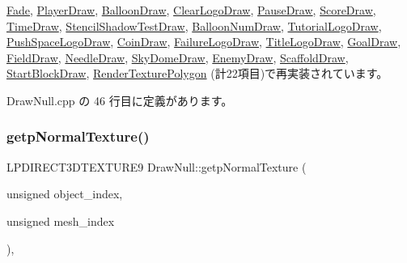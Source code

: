 \mbox{\hyperlink{class_fade_a468f87b671026f883443d6cdceeb95c6}{Fade}}, \mbox{\hyperlink{class_player_draw_a334e94f368f6bd571da866d69333f313}{Player\+Draw}}, \mbox{\hyperlink{class_balloon_draw_ab98a9333dcdf57c0ede287444b7cbabb}{Balloon\+Draw}}, \mbox{\hyperlink{class_clear_logo_draw_abcbd0cd8663e0262bcdd83356516082b}{Clear\+Logo\+Draw}}, \mbox{\hyperlink{class_pause_draw_a36622378926e01e7a401b6e201cb4f16}{Pause\+Draw}}, \mbox{\hyperlink{class_score_draw_adb995c83624c2eab8b8a15d1182df5b8}{Score\+Draw}}, \mbox{\hyperlink{class_time_draw_a3624fef571681cf4861891aa073338a0}{Time\+Draw}}, \mbox{\hyperlink{class_stencil_shadow_test_draw_a8ab105b75d673adc52698a8401c6525c}{Stencil\+Shadow\+Test\+Draw}}, \mbox{\hyperlink{class_balloon_num_draw_a9a337ac248ebb73dc32ef407221a6478}{Balloon\+Num\+Draw}}, \mbox{\hyperlink{class_tutorial_logo_draw_aade531190180c385c266f5698f99735d}{Tutorial\+Logo\+Draw}}, \mbox{\hyperlink{class_push_space_logo_draw_a9e0875967651293ef97713477334bc2e}{Push\+Space\+Logo\+Draw}}, \mbox{\hyperlink{class_coin_draw_ad8cbbe87f4cf4428214f50492c731f5f}{Coin\+Draw}}, \mbox{\hyperlink{class_failure_logo_draw_a6e6fb80dc21af9318d659bc3fa71c0b5}{Failure\+Logo\+Draw}}, \mbox{\hyperlink{class_title_logo_draw_a34fa4366f1ff190a08a36f8e402f6941}{Title\+Logo\+Draw}}, \mbox{\hyperlink{class_goal_draw_a536a23c043576f9032e6651d7644d038}{Goal\+Draw}}, \mbox{\hyperlink{class_field_draw_ad399978201f737f4c0dd2b3990fa6b34}{Field\+Draw}}, \mbox{\hyperlink{class_needle_draw_a7ae74f52a190793745b5339a6be559d7}{Needle\+Draw}}, \mbox{\hyperlink{class_sky_dome_draw_accbc05d1bbde9ad9d6b7180d91e9ed89}{Sky\+Dome\+Draw}}, \mbox{\hyperlink{class_enemy_draw_afbb8ac19041abda280ece7737103dc66}{Enemy\+Draw}}, \mbox{\hyperlink{class_scaffold_draw_a337aafb07b51a215f7f25ab67202b102}{Scaffold\+Draw}}, \mbox{\hyperlink{class_start_block_draw_a062b7069d21ec07630f6c8aeea532401}{Start\+Block\+Draw}}, \mbox{\hyperlink{class_render_texture_polygon_a76ab48dff0a23ee4db47da598f4d6a70}{Render\+Texture\+Polygon}} (計22項目)で再実装されています。



 Draw\+Null.\+cpp の 46 行目に定義があります。

\mbox{\label{class_draw_null_abdb03713b973fd1f65c914fa146414a1}} 
\subsubsection{\texorpdfstring{getp\+Normal\+Texture()}{getpNormalTexture()}}
{\footnotesize\ttfamily L\+P\+D\+I\+R\+E\+C\+T3\+D\+T\+E\+X\+T\+U\+R\+E9 Draw\+Null\+::getp\+Normal\+Texture (\begin{DoxyParamCaption}\item[{unsigned}]{object\+\_\+index,  }\item[{unsigned}]{mesh\+\_\+index }\end{DoxyParamCaption})\hspace{0.3cm}{\ttfamily [override]}, {\ttfamily [virtual]}}



